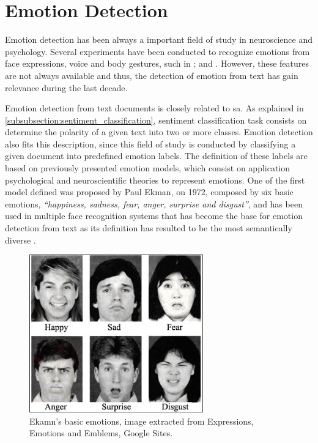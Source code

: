 
\section{Emotion Detection}
\label{sec:emotion_detection}

Emotion detection has been always a important field of study in neuroscience and psychology. Several experiments have been conducted to recognize emotions from face expressions, voice and body gestures, such in \cite{bassili1979emotion}; \cite{banziger2009emotion} and \cite{gunes2007bi}. However, these features are not always available and thus, the detection of emotion from text has gain relevance during the last decade.

Emotion detection from text documents is closely related to \acrshort{sa}. As explained in \ref{subsubsection:sentiment_classification}, sentiment classification task consists on determine the polarity of a given text into two or more classes. Emotion detection also fits this description, since this field of study is conducted by classifying a given document into predefined emotion labels. The definition of these labels are based on previously presented emotion models, which consist on application psychological and neuroscientific theories to represent emotions. One of the first model defined was proposed by Paul Ekman, on 1972, composed by six basic emotions, \textit{``happiness, sadness, fear, anger, surprise and disgust''}, and has been used in multiple face recognition systems that has become the base for emotion detection from text \cite{StevenEmotion2011Classification} as its definition has resulted to be the most semantically diverse \cite{bann2013conceptualisation}.

\begin{figure}[!htp]
  \center
  \includegraphics[width=0.67\textwidth]{figures/emotions_ekman}
  \caption{Ekamn's basic emotions, image extracted from Expressions, Emotions and Emblems, Google Sites.}
  \label{fig:ekman_basic_emotions}
\end{figure}

